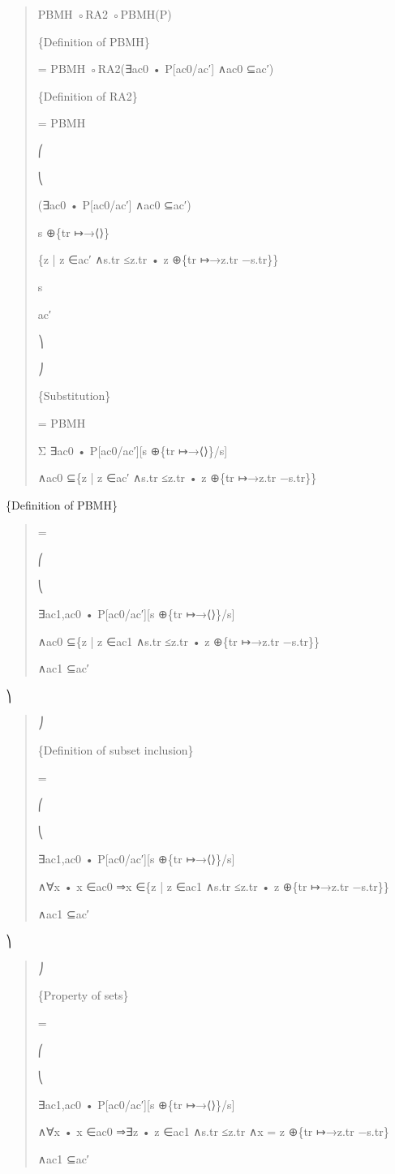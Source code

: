 \documentclass[11pt]{article}
\begin{document}
\begin{quote}\small\raggedright
PBMH ◦RA2 ◦PBMH(P)
\par
\{Definition of PBMH\}
\par
= PBMH ◦RA2(∃ac0 • P[ac0/ac′] ∧ac0 ⊆ac′)
\par
\{Definition of RA2\}
\par
= PBMH
\par
⎛
\par
⎝
\par
(∃ac0 • P[ac0/ac′] ∧ac0 ⊆ac′)
\par
s ⊕\{tr ↦→⟨⟩\}
\par
\{z | z ∈ac′ ∧s.tr ≤z.tr • z ⊕\{tr ↦→z.tr −s.tr\}\}
\par
s
\par
ac′
\par
⎞
\par
⎠
\par
\{Substitution\}
\par
= PBMH
\par
Σ ∃ac0 • P[ac0/ac′][s ⊕\{tr ↦→⟨⟩\}/s]
\par
∧ac0 ⊆\{z | z ∈ac′ ∧s.tr ≤z.tr • z ⊕\{tr ↦→z.tr −s.tr\}\}
\end{quote}

\{Definition of PBMH\}

\begin{quote}\small\raggedright
=
\par
⎛
\par
⎝
\par
∃ac1,ac0 • P[ac0/ac′][s ⊕\{tr ↦→⟨⟩\}/s]
\par
∧ac0 ⊆\{z | z ∈ac1 ∧s.tr ≤z.tr • z ⊕\{tr ↦→z.tr −s.tr\}\}
\par
∧ac1 ⊆ac′
\end{quote}

⎞

\begin{quote}\small\raggedright
⎠
\par
\{Definition of subset inclusion\}
\par
=
\par
⎛
\par
⎝
\par
∃ac1,ac0 • P[ac0/ac′][s ⊕\{tr ↦→⟨⟩\}/s]
\par
∧∀x • x ∈ac0 ⇒x ∈\{z | z ∈ac1 ∧s.tr ≤z.tr • z ⊕\{tr ↦→z.tr −s.tr\}\}
\par
∧ac1 ⊆ac′
\end{quote}

⎞

\begin{quote}\small\raggedright
⎠
\par
\{Property of sets\}
\par
=
\par
⎛
\par
⎝
\par
∃ac1,ac0 • P[ac0/ac′][s ⊕\{tr ↦→⟨⟩\}/s]
\par
∧∀x • x ∈ac0 ⇒∃z • z ∈ac1 ∧s.tr ≤z.tr ∧x = z ⊕\{tr ↦→z.tr −s.tr\}
\par
∧ac1 ⊆ac′
\end{quote}
\end{document}
